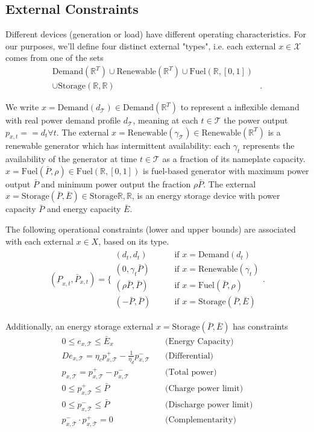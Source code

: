 \documentclass[journal,11pt]{IEEEtran}
\newcommand{\R}{\mathbb{R}}
\newcommand{\X}{\mathcal{X}}
\newcommand{\T}{\mathcal{T}}
\begin{document}
\subsection{External Constraints}

Different devices (generation or load) have different operating characteristics.
For our purposes, we'll define four distinct external "types", i.e. each external
$x\in\X$ comes from one of the sets
\begin{align*}
  \text{Demand}(\R^T) \cup \text{Renewable}(\R^T) \cup \text{Fuel}(\R, [0, 1]) & \\
  \cup \text{Storage}(\R, \R)&.
\end{align*}

We write $x=\text{Demand}(d_\T) \in \text{Demand}(\R^T)$ to represent a inflexible demand 
with real power demand profile $d_\T$, meaning at each $t \in \T$ the power output
$p_{x, t} == d_t \forall t$. The external
$x=\text{Renewable}(\gamma_\T) \in \text{Renewable}(\R^T)$ is a renewable generator
which has intermittent availability: each $\gamma_t$ represents the availability of
the generator at time $t\in\T$ as a fraction of its nameplate capacity.
$x=\text{Fuel}(\bar{P}, \rho) \in \text{Fuel}(\R, [0, 1])$ is fuel-based generator
with maximum power output $\bar{P}$ and minimum power output the fraction
$\rho\bar{P}$. The external $x=\text{Storage}(\bar{P}, \bar{E}) \in \text{Storage}{\R, \R}$,
is an energy storage device with power capacity $\bar{P}$ and energy capacity $\bar{E}$.

The following operational constraints (lower and upper bounds) are associated with
each external $x \in X$, based on its type. 
\begin{align*}
  (\underbar{P}_{x, t}, \bar{P}_{x, t}) = \biggl\{
    \begin{array}{ll}
      (d_t, d_t) &\qquad \text{if } x=\text{Demand}(d_t)\\
      (0, \gamma_t \bar{P}) &\qquad \text{if } x=\text{Renewable}(\gamma_t)\\
      (\rho \bar{P}, \bar{P}) &\qquad \text{if } x=\text{Fuel}(\bar{P}, \rho)\\
      (-\bar{P}, \bar{P}) &\qquad \text{if } x=\text{Storage}(\bar{P}, \bar{E})
    \end{array}
  \biggr.
\end{align*}

Additionally, an energy storage external $x=\text{Storage}(\bar{P}, \bar{E})$
has constraints
\begin{align*}
  0 \leq e_{x, \T} \leq \bar{E}_x & \quad \text{(Energy Capacity)}\\
  D e_{x, \T} = \eta_c p_{x, \T}^{+} - \frac{1}{\eta_d} p_{x, \T}^{-}
    &\quad \text{(Differential)}\\
  p_{x, \T} = p_{x, \T}^{+} - p_{x, \T}^{-} &\quad \text{(Total power)}\\
  0 \leq p_{x, \T}^{+} \leq \bar{P} &\quad \text{(Charge power limit)}\\
  0 \leq p_{x, \T}^{-} \leq \bar{P} &\quad \text{(Discharge power limit)} \\
  p_{x, \T}^{-} \cdot p_{x, \T}^{+} = 0  &\quad \text{(Complementarity)}
\end{align*}
\end{document}

